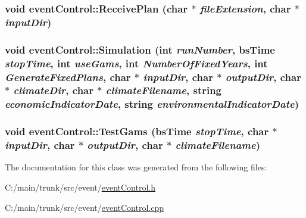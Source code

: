 \label{classevent_control_abc86856c0212792527d036ac7cca53fb}
\hypertarget{classevent_control_a47e163a529ae0e98fd83a31410731cde}{
\subsubsection[{ReceivePlan}]{\setlength{\rightskip}{0pt plus 5cm}void eventControl::ReceivePlan (char $\ast$ {\em fileExtension}, \/  char $\ast$ {\em inputDir})}}
\label{classevent_control_a47e163a529ae0e98fd83a31410731cde}
\hypertarget{classevent_control_a8def131d92f231393e486f28ff0cf00c}{
\subsubsection[{Simulation}]{\setlength{\rightskip}{0pt plus 5cm}void eventControl::Simulation (int {\em runNumber}, \/  {\bf bsTime} {\em stopTime}, \/  int {\em useGams}, \/  int {\em NumberOfFixedYears}, \/  int {\em GenerateFixedPlans}, \/  char $\ast$ {\em inputDir}, \/  char $\ast$ {\em outputDir}, \/  char $\ast$ {\em climateDir}, \/  char $\ast$ {\em climateFilename}, \/  string {\em economicIndicatorDate}, \/  string {\em environmentalIndicatorDate})}}
\label{classevent_control_a8def131d92f231393e486f28ff0cf00c}
\hypertarget{classevent_control_a4c270645b2751ad6c40fccd245455689}{
\subsubsection[{TestGams}]{\setlength{\rightskip}{0pt plus 5cm}void eventControl::TestGams ({\bf bsTime} {\em stopTime}, \/  char $\ast$ {\em inputDir}, \/  char $\ast$ {\em outputDir}, \/  char $\ast$ {\em climateFilename})}}
\label{classevent_control_a4c270645b2751ad6c40fccd245455689}


The documentation for this class was generated from the following files:\begin{DoxyCompactItemize}
\item 
C:/main/trunk/src/event/\hyperlink{event_control_8h}{eventControl.h}\item 
C:/main/trunk/src/event/\hyperlink{event_control_8cpp}{eventControl.cpp}\end{DoxyCompactItemize}
